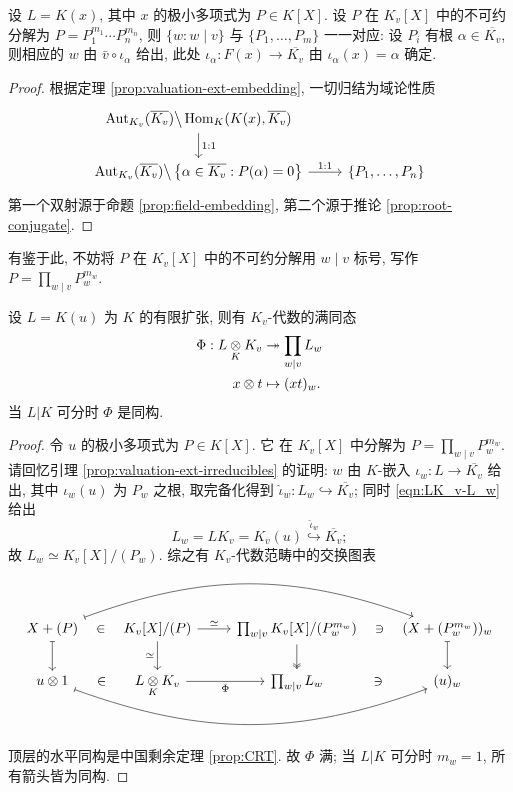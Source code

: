 \begin{lemma}\label{prop:valuation-ext-irreducibles}
	设 $L = K(x)$, 其中 $x$ 的极小多项式为 $P \in K[X]$. 设 $P$ 在 $K_v[X]$ 中的不可约分解为 $P = P_1^{m_1} \cdots P_n^{m_n}$, 则 $\{w: w \mid v\}$ 与 $\{P_1, \ldots, P_m\}$ 一一对应: 设 $P_i$ 有根 $\alpha \in \overline{K_v}$, 则相应的 $w$ 由 $\bar{v} \circ \iota_\alpha$ 给出, 此处 $\iota_\alpha: F(x) \to \overline{K_v}$ 由 $\iota_\alpha(x) = \alpha$ 确定.
\end{lemma}
\begin{proof}
	根据定理 \ref{prop:valuation-ext-embedding}, 一切归结为域论性质
	\[\begin{tikzcd}
		\Aut_{K_v}(\overline{K_v}) \big\backslash \Hom_K(K(x), \overline{K_v}) \arrow[d, "1:1"] & \\
		\Aut_{K_v}(\overline{K_v}) \big\backslash \left\{ \alpha \in \overline{K_v}: P(\alpha)=0 \right\} \arrow[r, "1:1"] & \{P_1, \ldots, P_n \}
	\end{tikzcd}\]
	第一个双射源于命题 \ref{prop:field-embedding}, 第二个源于推论 \ref{prop:root-conjugate}.
\end{proof}
有鉴于此, 不妨将 $P$ 在 $K_v[X]$ 中的不可约分解用 $w \mid v$ 标号, 写作 $P = \prod_{w \mid v} P_w^{m_w}$.

\begin{theorem}\label{prop:valuation-tensor}
	设 $L=K(u)$ 为 $K$ 的有限扩张, 则有 $K_v$-代数的满同态
	\begin{align*}
		\Phi: L \underset{K}{\otimes} K_v & \twoheadrightarrow \prod_{w \mid v} L_w \\
		x \otimes t & \mapsto (xt)_w.
	\end{align*}
	当 $L|K$ 可分时 $\Phi$ 是同构.
\end{theorem}
\begin{proof}
	令 $u$ 的极小多项式为 $P \in K[X]$. 它 在 $K_v[X]$ 中分解为 $P = \prod_{w \mid v} P_w^{m_w}$. 请回忆引理 \ref{prop:valuation-ext-irreducibles} 的证明: $w$ 由 $K$-嵌入 $\iota_w: L \to \overline{K_v}$ 给出, 其中 $\iota_w(u)$ 为 $P_w$ 之根, 取完备化得到 $\hat{\iota}_w: L_w \hookrightarrow \overline{K_v}$; 同时 \eqref{eqn:LK_v-L_w} 给出
	\[ L_w = LK_v = K_v(u) \stackrel{\hat{\iota}_w}{\hookrightarrow} \overline{K_v}; \]
	故 $L_w \simeq K_v[X]/(P_w)$. 综之有 $K_v$-代数范畴中的交换图表
	\[\begin{tikzcd}
		X+(P) \arrow[phantom, r, "\in" description] \arrow[mapsto, d] \arrow[mapsto, rrr, bend left=20] & K_v[X]/(P) \arrow[r, "\simeq"] \arrow[d, "\simeq"'] & \prod_{w \mid v} K_v[X]/(P_w^{m_w}) \arrow[twoheadrightarrow, d] & (X + (P_w^{m_w}))_w \arrow[phantom, l, "\ni" description] \arrow[mapsto, d] \\
		u \otimes 1 \arrow[phantom, r, "\in" description] \arrow[mapsto, rrr, bend right=20] & L \dotimes{K} K_v \arrow[r, "\Phi"'] & \prod_{w \mid v} L_w & (u)_w \arrow[phantom, l, "\ni" description]
	\end{tikzcd}\]
	顶层的水平同构是中国剩余定理 \ref{prop:CRT}. 故 $\Phi$ 满; 当 $L|K$ 可分时 $m_w = 1$, 所有箭头皆为同构.
\end{proof}

